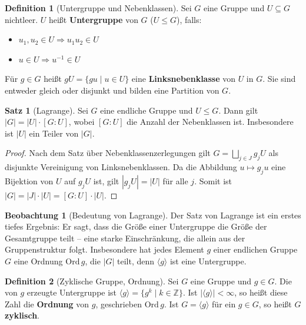 ﻿\documentclass[a4paper,12pt]{report}
\theoremstyle{definition}
\newtheorem{definition}{Definition}
\newtheorem{satz}{Satz}
\newtheorem{beobachtung}{Beobachtung}
\begin{document}
\begin{definition}[Untergruppe und Nebenklassen]
    Sei $G$ eine Gruppe und $U \subseteq G$ nichtleer. $U$ heißt
    \textbf{Untergruppe} von $G$ ($U \le G$), falls:
    \begin{itemize}
        \item[-] $u_1, u_2 \in U \Rightarrow u_1 u_2 \in U$
        \item[-] $u \in U \Rightarrow u^{-1} \in U$
    \end{itemize}
    Für $g \in G$ heißt $gU = \{gu \mid u \in U\}$ eine \textbf{Linksnebenklasse}
    von $U$ in $G$. Sie sind entweder gleich oder disjunkt und bilden eine
    Partition von $G$.
\end{definition}

\begin{satz}[Lagrange]
    Sei $G$ eine endliche Gruppe und $U \le G$. Dann gilt $|G| = |U| \cdot [G:U]$,
    wobei $[G:U]$ die Anzahl der Nebenklassen ist. Insbesondere ist $|U|$ ein
    Teiler von $|G|$.
\end{satz}
\begin{proof}
    Nach dem Satz über Nebenklassenzerlegungen gilt $G = \bigsqcup_{j \in J} g_j U$
    als disjunkte Vereinigung von Linksnebenklassen. Da die Abbildung
    $u \mapsto g_j u$ eine Bijektion von $U$ auf $g_j U$ ist, gilt
    $|g_j U| = |U|$ für alle $j$. Somit ist $|G| = |J| \cdot |U| = [G:U] \cdot |U|$.
\end{proof}


\begin{beobachtung}[Bedeutung von Lagrange]
    Der Satz von Lagrange ist ein erstes tiefes Ergebnis: Er sagt, dass die
    Größe einer Untergruppe die Größe der Gesamtgruppe teilt -- eine starke
    Einschränkung, die allein aus der Gruppenstruktur folgt. Insbesondere hat
    jedes Element $g$ einer endlichen Gruppe $G$ eine Ordnung $\mathrm{Ord}\, g$,
    die $|G|$ teilt, denn $\langle g \rangle$ ist eine Untergruppe.
\end{beobachtung}

\begin{definition}[Zyklische Gruppe, Ordnung]
    Sei $G$ eine Gruppe und $g \in G$. Die von $g$ erzeugte Untergruppe ist
    $\langle g \rangle = \{g^k \mid k \in \mathbb{Z}\}$.
    Ist $|\langle g \rangle| < \infty$, so heißt diese Zahl die
    \textbf{Ordnung} von $g$, geschrieben $\mathrm{Ord}\, g$.
    Ist $G = \langle g \rangle$ für ein $g \in G$, so heißt $G$ \textbf{zyklisch}.
\end{definition}
\end{document}
